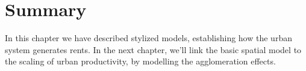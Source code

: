 





 \section{Summary}
In this chapter we have described %
stylized models, establishing how the urban system generates rents. %
In the next chapter, we'll link the basic spatial model to the scaling of urban productivity, by modelling the agglomeration effects.

